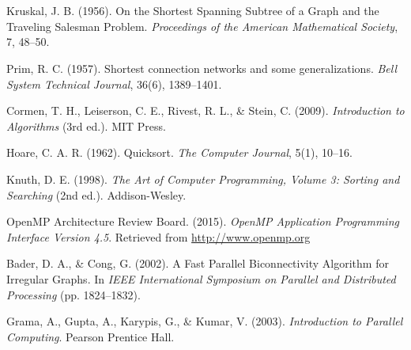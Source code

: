 \documentclass[11pt]{article}
\begin{document}
\section*{}
\begin{thebibliography}{9}

Kruskal, J. B. (1956). On the Shortest Spanning Subtree of a Graph and the Traveling Salesman Problem. \textit{Proceedings of the American Mathematical Society}, 7, 48–50.

Prim, R. C. (1957). Shortest connection networks and some generalizations. \textit{Bell System Technical Journal}, 36(6), 1389–1401.

Cormen, T. H., Leiserson, C. E., Rivest, R. L., \& Stein, C. (2009). \textit{Introduction to Algorithms} (3rd ed.). MIT Press.

Hoare, C. A. R. (1962). Quicksort. \textit{The Computer Journal}, 5(1), 10–16.

Knuth, D. E. (1998). \textit{The Art of Computer Programming, Volume 3: Sorting and Searching} (2nd ed.). Addison-Wesley.

OpenMP Architecture Review Board. (2015). \textit{OpenMP Application Programming Interface Version 4.5}. Retrieved from \url{http://www.openmp.org}

Bader, D. A., \& Cong, G. (2002). A Fast Parallel Biconnectivity Algorithm for Irregular Graphs. In \textit{IEEE International Symposium on Parallel and Distributed Processing} (pp. 1824–1832).

Grama, A., Gupta, A., Karypis, G., \& Kumar, V. (2003). \textit{Introduction to Parallel Computing}. Pearson Prentice Hall.

\end{thebibliography}
\end{document}
